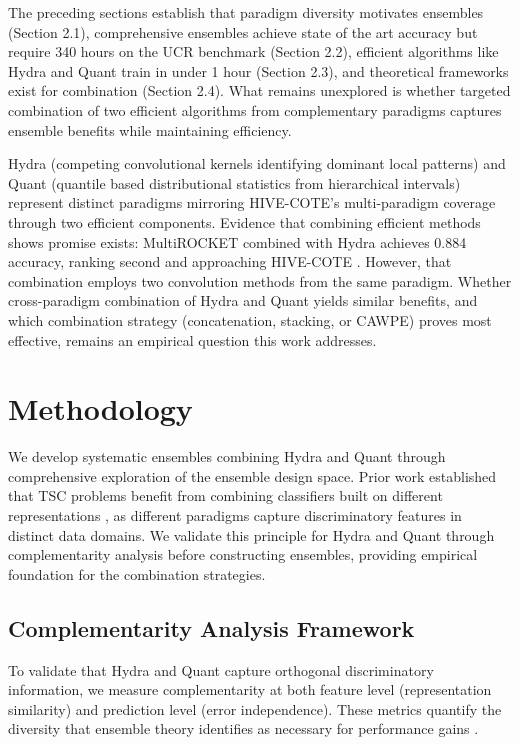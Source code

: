 \documentclass[pdflatex,sn-basic]{sn-jnl}           %
\theoremstyle{thmstyleone}%
\theoremstyle{thmstyletwo}%
\theoremstyle{thmstylethree}%
\begin{document}
The preceding sections establish that paradigm diversity motivates ensembles (Section 2.1), comprehensive ensembles achieve state of the art accuracy but require 340 hours on the UCR benchmark (Section 2.2), efficient algorithms like Hydra and Quant train in under 1 hour (Section 2.3), and theoretical frameworks exist for combination (Section 2.4). What remains unexplored is whether targeted combination of two efficient algorithms from complementary paradigms captures ensemble benefits while maintaining efficiency.

Hydra (competing convolutional kernels identifying dominant local patterns) and Quant (quantile based distributional statistics from hierarchical intervals) represent distinct paradigms mirroring HIVE-COTE's multi-paradigm coverage through two efficient components. Evidence that combining efficient methods shows promise exists: MultiROCKET combined with Hydra achieves 0.884 accuracy, ranking second and approaching HIVE-COTE \citep[Table~14, p.~2008]{bakeoff-redux}. However, that combination employs two convolution methods from the same paradigm. Whether cross-paradigm combination of Hydra and Quant yields similar benefits, and which combination strategy (concatenation, stacking, or CAWPE) proves most effective, remains an empirical question this work addresses.


\section{Methodology}\label{sec3}

We develop systematic ensembles combining Hydra and Quant through comprehensive exploration of the ensemble design space. Prior work established that TSC problems benefit from combining classifiers built on different representations \citep[p.~3213]{hive-cote-2}, as different paradigms capture discriminatory features in distinct data domains. We validate this principle for Hydra and Quant through complementarity analysis before constructing ensembles, providing empirical foundation for the combination strategies.

\subsection{Complementarity Analysis Framework}\label{subsec:complementarity}

To validate that Hydra and Quant capture orthogonal discriminatory information, we measure complementarity at both feature level (representation similarity) and prediction level (error independence). These metrics quantify the diversity that ensemble theory identifies as necessary for performance gains \citep{stacked-generalization}.
\end{document}
